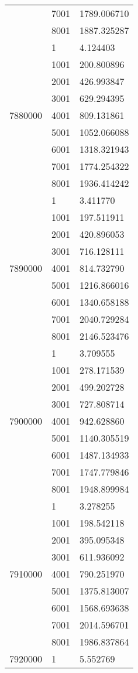 \begin{table}[htb!]
\begin{tabular}{lll}
 & 7001 & 1789.006710 \\
 & 8001 & 1887.325287 \\
\multirow[c]{9}{*}{7880000} & 1 & 4.124403 \\
 & 1001 & 200.800896 \\
 & 2001 & 426.993847 \\
 & 3001 & 629.294395 \\
 & 4001 & 809.131861 \\
 & 5001 & 1052.066088 \\
 & 6001 & 1318.321943 \\
 & 7001 & 1774.254322 \\
 & 8001 & 1936.414242 \\
\multirow[c]{9}{*}{7890000} & 1 & 3.411770 \\
 & 1001 & 197.511911 \\
 & 2001 & 420.896053 \\
 & 3001 & 716.128111 \\
 & 4001 & 814.732790 \\
 & 5001 & 1216.866016 \\
 & 6001 & 1340.658188 \\
 & 7001 & 2040.729284 \\
 & 8001 & 2146.523476 \\
\multirow[c]{9}{*}{7900000} & 1 & 3.709555 \\
 & 1001 & 278.171539 \\
 & 2001 & 499.202728 \\
 & 3001 & 727.808714 \\
 & 4001 & 942.628860 \\
 & 5001 & 1140.305519 \\
 & 6001 & 1487.134933 \\
 & 7001 & 1747.779846 \\
 & 8001 & 1948.899984 \\
\multirow[c]{9}{*}{7910000} & 1 & 3.278255 \\
 & 1001 & 198.542118 \\
 & 2001 & 395.095348 \\
 & 3001 & 611.936092 \\
 & 4001 & 790.251970 \\
 & 5001 & 1375.813007 \\
 & 6001 & 1568.693638 \\
 & 7001 & 2014.596701 \\
 & 8001 & 1986.837864 \\
\multirow[c]{9}{*}{7920000} & 1 & 5.552769 \\

\end{tabular}
\end{table}
